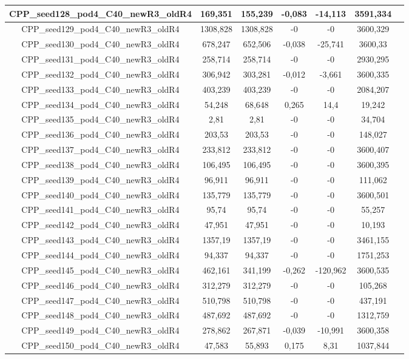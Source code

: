 \documentclass[a4paper]{article}
\begin{document}
\begin{center}
\begin{longtable}{ccccccc}
\hline
CPP\_seed128\_pod4\_C40\_newR3\_oldR4 & 169,351 & 155,239 & -0,083 & -14,113 & 3591,334\\
\hline
CPP\_seed129\_pod4\_C40\_newR3\_oldR4 & 1308,828 & 1308,828 & -0 & -0 & 3600,329\\
\hline
CPP\_seed130\_pod4\_C40\_newR3\_oldR4 & 678,247 & 652,506 & -0,038 & -25,741 & 3600,33\\
\hline
CPP\_seed131\_pod4\_C40\_newR3\_oldR4 & 258,714 & 258,714 & -0 & -0 & 2930,295\\
\hline
CPP\_seed132\_pod4\_C40\_newR3\_oldR4 & 306,942 & 303,281 & -0,012 & -3,661 & 3600,335\\
\hline
CPP\_seed133\_pod4\_C40\_newR3\_oldR4 & 403,239 & 403,239 & -0 & -0 & 2084,207\\
\hline
CPP\_seed134\_pod4\_C40\_newR3\_oldR4 & 54,248 & 68,648 & 0,265 & 14,4 & 19,242\\
\hline
CPP\_seed135\_pod4\_C40\_newR3\_oldR4 & 2,81 & 2,81 & -0 & -0 & 34,704\\
\hline
CPP\_seed136\_pod4\_C40\_newR3\_oldR4 & 203,53 & 203,53 & -0 & -0 & 148,027\\
\hline
CPP\_seed137\_pod4\_C40\_newR3\_oldR4 & 233,812 & 233,812 & -0 & -0 & 3600,407\\
\hline
CPP\_seed138\_pod4\_C40\_newR3\_oldR4 & 106,495 & 106,495 & -0 & -0 & 3600,395\\
\hline
CPP\_seed139\_pod4\_C40\_newR3\_oldR4 & 96,911 & 96,911 & -0 & -0 & 111,062\\
\hline
CPP\_seed140\_pod4\_C40\_newR3\_oldR4 & 135,779 & 135,779 & -0 & -0 & 3600,501\\
\hline
CPP\_seed141\_pod4\_C40\_newR3\_oldR4 & 95,74 & 95,74 & -0 & -0 & 55,257\\
\hline
CPP\_seed142\_pod4\_C40\_newR3\_oldR4 & 47,951 & 47,951 & -0 & -0 & 10,193\\
\hline
CPP\_seed143\_pod4\_C40\_newR3\_oldR4 & 1357,19 & 1357,19 & -0 & -0 & 3461,155\\
\hline
CPP\_seed144\_pod4\_C40\_newR3\_oldR4 & 94,337 & 94,337 & -0 & -0 & 1751,253\\
\hline
CPP\_seed145\_pod4\_C40\_newR3\_oldR4 & 462,161 & 341,199 & -0,262 & -120,962 & 3600,535\\
\hline
CPP\_seed146\_pod4\_C40\_newR3\_oldR4 & 312,279 & 312,279 & -0 & -0 & 105,268\\
\hline
CPP\_seed147\_pod4\_C40\_newR3\_oldR4 & 510,798 & 510,798 & -0 & -0 & 437,191\\
\hline
CPP\_seed148\_pod4\_C40\_newR3\_oldR4 & 487,692 & 487,692 & -0 & -0 & 1312,759\\
\hline
CPP\_seed149\_pod4\_C40\_newR3\_oldR4 & 278,862 & 267,871 & -0,039 & -10,991 & 3600,358\\
\hline
CPP\_seed150\_pod4\_C40\_newR3\_oldR4 & 47,583 & 55,893 & 0,175 & 8,31 & 1037,844\\
\hline
\end{longtable}
\end{center}
\end{document}
